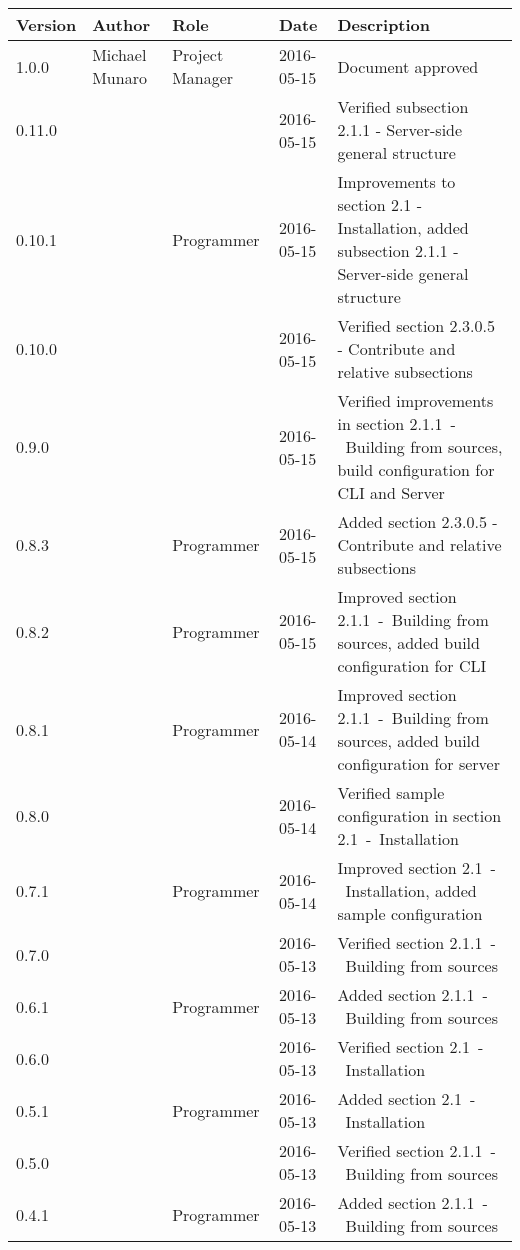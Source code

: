 \documentclass{scalatekids-article}
\begin{document}
\begin{center}
  \begin{longtable}{| l | l | l | l | p{5cm} |}
    \hline
    Version & Author & Role & Date & Description \\
    \hline
    1.0.0 & Michael Munaro & Project Manager & 2016-05-15 & Document approved\\
    \hline
    0.11.0 & & & 2016-05-15 & Verified subsection 2.1.1 - Server-side general structure\\
    \hline
    0.10.1 & & Programmer & 2016-05-15 & Improvements to section 2.1 - Installation, added subsection 2.1.1 - Server-side general structure\\
    \hline
    0.10.0 & & & 2016-05-15 & Verified section 2.3.0.5 - Contribute and relative subsections\\
    \hline
    0.9.0 & & & 2016-05-15 & Verified improvements in section 2.1.1\ -\ Building from sources, build configuration for CLI and Server\\
    \hline
    0.8.3 & & Programmer & 2016-05-15 & Added section 2.3.0.5 - Contribute and relative subsections \\
    \hline
    0.8.2 & & Programmer & 2016-05-15 & Improved section 2.1.1\ -\ Building from sources, added build configuration for CLI\\
    \hline
    0.8.1 & & Programmer & 2016-05-14 & Improved section 2.1.1\ -\ Building from sources, added build configuration for server\\
    \hline
    0.8.0 & & & 2016-05-14 & Verified sample configuration in section 2.1\ -\ Installation\\
    \hline
    0.7.1 & & Programmer & 2016-05-14 & Improved section 2.1\ -\ Installation, added sample configuration\\
    \hline
    0.7.0 & & & 2016-05-13 & Verified section 2.1.1\ -\ Building from sources\\
    \hline
    0.6.1 & & Programmer & 2016-05-13 & Added section 2.1.1\ -\ Building from sources\\
    \hline
    0.6.0 & & & 2016-05-13 & Verified section 2.1\ -\ Installation\\
    \hline
    0.5.1 & & Programmer & 2016-05-13 & Added section 2.1\ -\ Installation\\
    \hline
    0.5.0 & & & 2016-05-13 & Verified section 2.1.1\ -\ Building from sources\\
    \hline
    0.4.1 & & Programmer & 2016-05-13 & Added section 2.1.1\ -\ Building from sources\\

\end{longtable}
\end{center}
\end{document}

